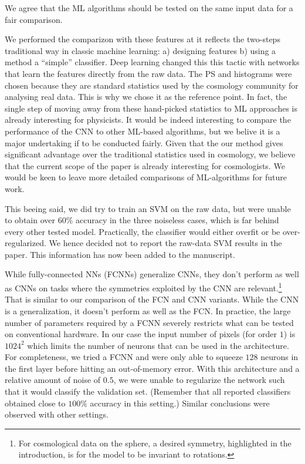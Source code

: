 \documentclass[12pt,a4paper]{article}
\newcommand{\nati}[1]{{\color[rgb]{.1,.6,.1}{NP: #1}}}
\newcommand{\1}{\b{1}}              %
\newcommand{\0}{\b{0}}              %
\begin{document}
We agree that the ML algorithms should be tested on the same input data for a fair comparison.

We performed the comparizon with these features at it reflects the two-steps traditional way in classic machine learning: a) designing features b) using a method a ``simple'' classifier. Deep learning changed this this tactic with networks that learn the features directly from the raw data.
The PS and histograms were chosen because they are standard statistics used by the cosmology community for analysing real data.
This is why we chose it as the reference point.
In fact, the single step of moving away from these hand-picked statistics to ML approaches is already interesting for physicists.
It would be indeed interesting to compare the performance of the CNN to other ML-based algorithms, but we belive it is a major undertaking if to be conducted fairly.
Given that the our method gives significant advantage over the traditional statistics used in cosmology, we believe that the current scope of the paper is already interesting for cosmologists.
We would be keen to leave more detailed comparisons of ML-algorithms for future work.


This beeing said, we did try to train an SVM on the raw data, but were unable to obtain over $60\%$ accuracy in the three noiseless cases, which is far behind every other tested model.
Practically, the classifier would either overfit or be over-regularized.
We hence decided not to report the raw-data SVM results in the paper.
This information has now been added to the manuscript.

While fully-connected NNs (FCNNs) generalize CNNs, they don't perform as well as CNNs on tasks where the symmetries exploited by the CNN are relevant.\footnote{For cosmological data on the sphere, a desired symmetry, highlighted in the introduction, is for the model to be invariant to rotations.}
That is similar to our comparison of the FCN and CNN variants.
While the CNN is a generalization, it doesn't perform as well as the FCN.
In practice, the large number of parameters required by a FCNN severely restricts what can be tested on conventional hardware. In our case the input number of pixels (for order $1$) is $1024^2$ which limits the number of neurons that can be used in the architecture. For completeness, we tried a FCNN and were only able to squeeze $128$ neurons in the first layer before hitting an out-of-memory error. With this architecture and a relative amount of noise of $0.5$, we were unable to regularize the network such that it would classify the validation set. (Remember that all reported classifiers obtained close to $100\%$ accuracy in this setting.) Similar conclusions were observed with other settings.
\end{document}
